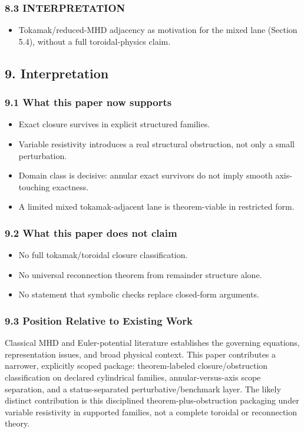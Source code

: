 \documentclass[11pt]{article}
\begin{document}
\subsubsection*{8.3 INTERPRETATION}
\begin{itemize}
\item Tokamak/reduced-MHD adjacency as motivation for the mixed lane (Section 5.4), without a full toroidal-physics claim.
\end{itemize}

\subsection*{9. Interpretation}

\subsubsection*{9.1 What this paper now supports}
\begin{itemize}
\item Exact closure survives in explicit structured families.
\item Variable resistivity introduces a real structural obstruction, not only a small perturbation.
\item Domain class is decisive: annular exact survivors do not imply smooth axis-touching exactness.
\item A limited mixed tokamak-adjacent lane is theorem-viable in restricted form.
\end{itemize}

\subsubsection*{9.2 What this paper does not claim}
\begin{itemize}
\item No full tokamak/toroidal closure classification.
\item No universal reconnection theorem from remainder structure alone.
\item No statement that symbolic checks replace closed-form arguments.
\end{itemize}

\subsubsection*{9.3 Position Relative to Existing Work}
Classical MHD and Euler-potential literature establishes the governing equations, representation issues, and broad physical context. This paper contributes a narrower, explicitly scoped package: theorem-labeled closure/obstruction classification on declared cylindrical families, annular-versus-axis scope separation, and a status-separated perturbative/benchmark layer. The likely distinct contribution is this disciplined theorem-plus-obstruction packaging under variable resistivity in supported families, not a complete toroidal or reconnection theory.
\end{document}
